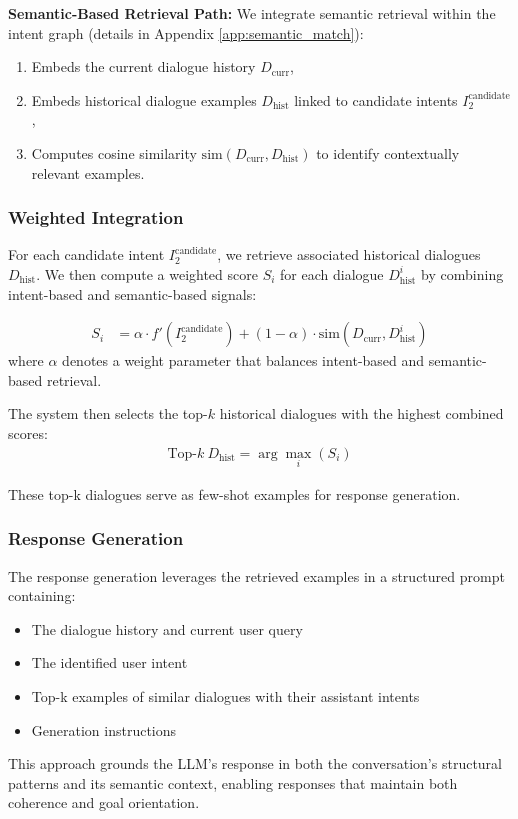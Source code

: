 \documentclass[
]{style/ceurart}
\begin{document}
\textbf{Semantic-Based Retrieval Path:} We integrate semantic retrieval within the intent graph (details in Appendix \ref{app:semantic_match}):
\begin{enumerate}
    \item Embeds the current dialogue history $D_\text{curr}$,
    \item Embeds historical dialogue examples $D_\text{hist}$ linked to candidate intents $I_2^{\text{candidate}}$,
    \item Computes cosine similarity $\text{sim}(D_\text{curr},D_\text{hist})$ to identify contextually relevant examples.
\end{enumerate}

\subsubsection {Weighted Integration}
For each candidate intent $I_2^{\text{candidate}}$, we retrieve associated historical dialogues $D_{\text{hist}}$. We then compute a weighted score $S_i$ for each dialogue $D_{\text{hist}}^i$ by combining intent-based and semantic-based signals:

\begin{equation}
\begin{split}
S_i & = \alpha \cdot f'(I_2^{\text{candidate}}) + (1-\alpha) \cdot \text{sim}(D_{\text{curr}}, D_{\text{hist}}^i)
\end{split}
\label{eq:weighted_score}
\end{equation} where $\alpha$ denotes a weight parameter that balances intent-based and semantic-based retrieval.

The system then selects the top-$k$ historical dialogues with the highest combined scores:
\begin{align}
\text{Top-}k\ D_{\text{hist}} = \arg\max_{i} (S_i) \label{eq:top_k_selection}
\end{align}

\noindent These top-k dialogues serve as few-shot examples for response generation.

\subsubsection {Response Generation}  

The response generation leverages the retrieved examples in a structured prompt containing:
\begin {itemize}
\item The dialogue history and current user query
\item The identified user intent
\item Top-k examples of similar dialogues with their assistant intents
\item Generation instructions
\end {itemize}
This approach grounds the LLM's response in both the conversation's structural patterns and its semantic context, enabling responses that maintain both coherence and goal orientation.
\end{document}
